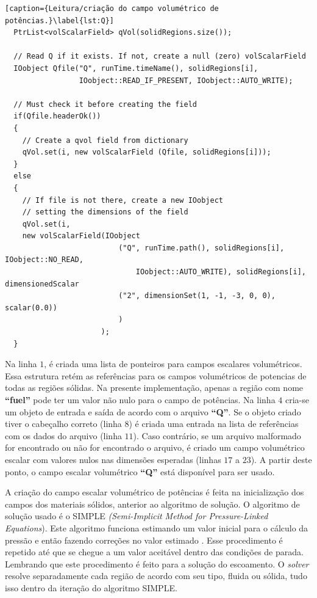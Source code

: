 \begin{lstlisting}[caption={Leitura/criação do campo volumétrico de potências.}\label{lst:Q}]
  PtrList<volScalarField> qVol(solidRegions.size());

  // Read Q if it exists. If not, create a null (zero) volScalarField
  IOobject Qfile("Q", runTime.timeName(), solidRegions[i],
                 IOobject::READ_IF_PRESENT, IOobject::AUTO_WRITE);

  // Must check it before creating the field
  if(Qfile.headerOk())
  {
    // Create a qvol field from dictionary
    qVol.set(i, new volScalarField (Qfile, solidRegions[i]));
  }
  else
  {
    // If file is not there, create a new IOobject
    // setting the dimensions of the field
    qVol.set(i,
    new volScalarField(IOobject
                          ("Q", runTime.path(), solidRegions[i], IOobject::NO_READ,
                              IOobject::AUTO_WRITE), solidRegions[i], dimensionedScalar
                          ("2", dimensionSet(1, -1, -3, 0, 0), scalar(0.0))
                          )
                      );
  }
\end{lstlisting}

Na linha $1$, é criada uma lista de ponteiros para campos escalares volumétricos. Essa estrutura
retém as referências para os campos volumétricos de potencias de todas as regiões sólidas. Na
presente implementação, apenas a região com nome \textbf{``fuel''} pode ter um valor não nulo
para o campo de potências. Na linha $4$ cria-se um objeto de entrada e saída de acordo com o
arquivo \textbf{``Q''}. Se o
objeto criado tiver o cabeçalho correto (linha $8$) é criada uma entrada na lista de referências com os
dados do arquivo (linha $11$). Caso contrário, se um arquivo malformado for encontrado ou
não for encontrado o arquivo, é criado um campo volumétrico escalar com valores nulos nas dimensões
esperadas (linhas $17$ a $23$). A partir deste ponto, o campo escalar volumétrico \textbf{``Q''}
está disponível para ser usado.

A criação do campo escalar volumétrico de potências é feita na inicialização dos campos dos materiais
sólidos, anterior ao algoritmo de solução. O algoritmo de solução usado é o SIMPLE
\textit{(Semi-Implicit Method for Pressure-Linked Equations}). Este algoritmo funciona
estimando um valor inicial para o cálculo da pressão e então fazendo correções no valor
estimado \cite{Versteeg2007}. Esse procedimento é repetido até que se chegue a um valor
aceitável dentro das condições de parada. Lembrando que este procedimento é feito para
a solução do escoamento. O \textit{solver} resolve separadamente cada região de acordo com seu
tipo, fluida ou sólida, tudo isso dentro da iteração do algoritmo SIMPLE.


